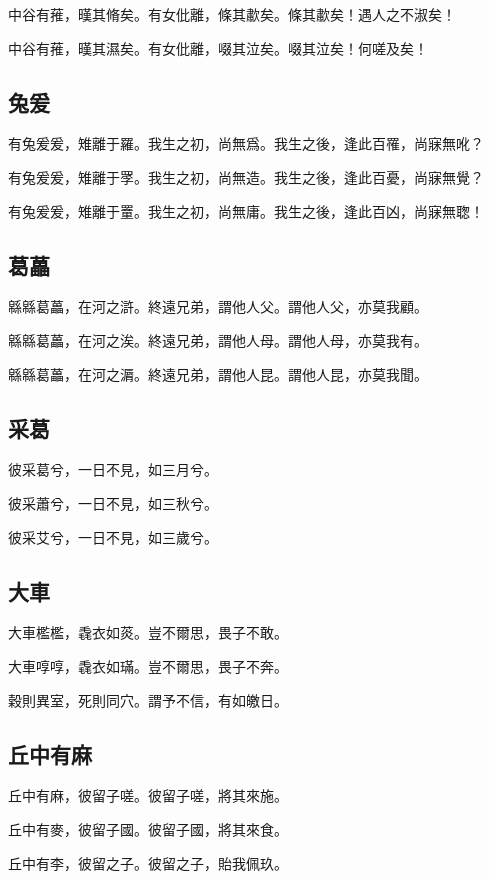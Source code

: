 中谷有蓷，暵其脩矣。有女仳離，條其歗矣。條其歗矣！遇人之不淑矣！

中谷有蓷，暵其濕矣。有女仳離，啜其泣矣。啜其泣矣！何嗟及矣！

\subsection[兔爰]{兔爰}

有兔爰爰，雉離于羅。我生之初，尚無爲。我生之後，逢此百罹，尚寐無吪？

有兔爰爰，雉離于罦。我生之初，尚無造。我生之後，逢此百憂，尚寐無覺？

有兔爰爰，雉離于罿。我生之初，尚無庸。我生之後，逢此百凶，尚寐無聦！

\subsection[葛藟]{葛藟}

緜緜葛藟，在河之滸。終遠兄弟，謂他人父。謂他人父，亦莫我顧。

緜緜葛藟，在河之涘。終遠兄弟，謂他人母。謂他人母，亦莫我有。

緜緜葛藟，在河之漘。終遠兄弟，謂他人昆。謂他人昆，亦莫我聞。

\subsection[采葛]{采葛}

彼采葛兮，一日不見，如三月兮。

彼采蕭兮，一日不見，如三秋兮。

彼采艾兮，一日不見，如三歲兮。

\subsection[大車]{大車}

大車檻檻，毳衣如菼。豈不爾思，畏子不敢。

大車啍啍，毳衣如璊。豈不爾思，畏子不奔。

穀則異室，死則同穴。謂予不信，有如皦日。

\subsection[丘中有麻]{丘中有麻}

丘中有麻，彼留子嗟。彼留子嗟，將其來施。

丘中有麥，彼留子國。彼留子國，將其來食。

丘中有李，彼留之子。彼留之子，貽我佩玖。
